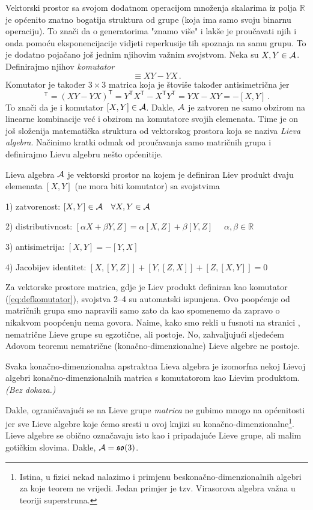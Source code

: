 Vektorski prostor sa svojom dodatnom operacijom množenja
skalarima iz polja $\mathbb{R}$ je općenito znatno bogatija struktura od grupe (koja
ima samo svoju binarnu operaciju). To znači da o generatorima "znamo više" i
lakše je proučavati njih i onda pomoću eksponencijacije vidjeti reperkusije tih
spoznaja na samu grupu.
To je dodatno pojačano još jednim njihovim važnim svojstvom.
Neka su $X,Y\in\mathcal{A}$. Definirajmo njihov \emph{komutator} 
\begin{equation}
    [X, Y] \equiv X Y - Y X \,.
    \label{eq:defkomutator}
\end{equation}
Komutator je također $3\times 3$ matrica koja je štoviše također antisimetrična
jer
\begin{equation}
 [X,Y]^\mathsf{T} = (XY-YX)^\mathsf{T} = Y^\mathsf{T} X^\mathsf{T} - X^\mathsf{T} Y^\mathsf{T}
 = YX-XY = -[X,Y] \,.
\end{equation}
To znači da je i komutator $[X,Y]\in\mathcal{A}$.
Dakle, $\mathcal{A}$ je zatvoren ne samo obzirom na linearne kombinacije već
i obzirom na komutatore svojih elemenata. Time je on još složenija matematička
struktura od vektorskog prostora koja se naziva  \emph{Lieva algebra}.
Načinimo kratki odmak od proučavanja samo matričnih grupa i
definirajmo Lievu algebru nešto općenitije.
\begin{definicija}
Lieva algebra $\mathcal{A}$ je vektorski prostor na kojem je definiran 
Liev produkt dvaju elemenata $[X,Y]$ (ne mora biti komutator) sa svojstvima

1) zatvorenost: $[X,Y]\in\mathcal{A} \quad \forall X,Y\in\mathcal{A}$

2) distributivnost: $[\alpha X + \beta Y, Z]=\alpha[X,Z]+\beta[Y,Z]$
$\quad \alpha,\beta \in \mathbb{R} $

3) antisimetrija: $[X,Y]=-[Y,X]$

4) Jacobijev identitet: $[X, [Y, Z]]+[Y, [Z, X]]+[Z, [X, Y]]=0$
\end{definicija}
Za vektorske prostore matrica, gdje je Liev produkt definiran kao
komutator (\ref{eq:defkomutator}), svojstva 2--4 su automatski ispunjena.
Ovo poopćenje od matričnih grupa smo napravili samo zato da kao
spomenemo da zapravo o nikakvom poopćenju nema govora.
Naime, kako smo rekli u fusnoti na stranici \pageref{fus:nematricne}, nematrične Lieve grupe
su egzotične, ali postoje. No, zahvaljujući sljedećem Adovom teoremu
nematrične (konačno-dimenzionalne) Lieve algebre ne postoje.
\begin{teorem}[Ado]
 Svaka konačno-dimenzionalna apstraktna Lieva algebra je izomorfna nekoj
 Lievoj algebri konačno-dimenzionalnih matrica s komutatorom kao Lievim produktom. \emph{(Bez
 dokaza.)}
\end{teorem}
Dakle, ograničavajući se na Lieve grupe \emph{matrica} ne gubimo mnogo
na općenitosti jer sve Lieve algebre koje ćemo sresti u ovoj knjizi su
konačno-dimenzionalne\footnote{Istina, u fizici nekad nalazimo i primjenu beskonačno-dimenzionalnih
algebri za koje teorem ne vrijedi. Jedan primjer je tzv. Virasorova algebra važna
u teoriji superstruna.}.
Lieve algebre se obično označavaju isto kao i pripadajuće Lieve grupe, ali malim gotičkim slovima.
Dakle, $\mathcal{A} = \mathfrak{so}(3)$.


